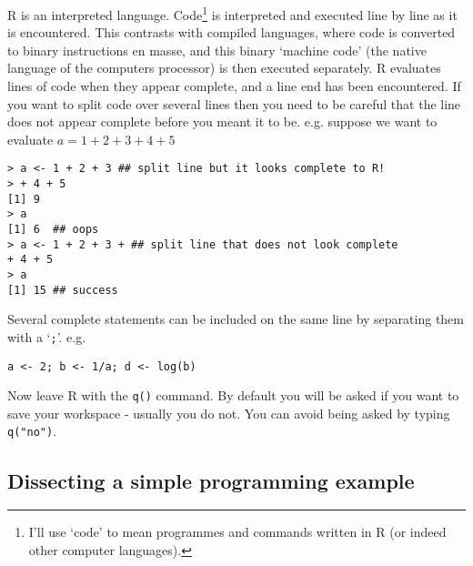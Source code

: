 \documentclass[10pt] {article}
\theoremstyle{definition}
\begin{document}
R is an interpreted language. Code\footnote{I'll use `code' to mean programmes and commands written in R (or indeed other computer languages).} is interpreted and executed line by line as it is encountered. This contrasts with compiled languages, where code is converted to binary instructions en masse, and this binary `machine code' (the native language of the computers processor) is then executed separately. R evaluates lines of code when they appear complete, and a line end has been encountered. If you want to split code over several lines then you need to be careful that the line does not appear complete before you meant it to be. e.g. suppose we want to evaluate $a=1+2+3+4+5$
\begin{lstlisting}
> a <- 1 + 2 + 3 ## split line but it looks complete to R!
> + 4 + 5 
[1] 9
> a 
[1] 6  ## oops
> a <- 1 + 2 + 3 + ## split line that does not look complete
+ 4 + 5
> a
[1] 15 ## success
\end{lstlisting}
Several complete statements can be included on the same line by separating them with a `{\tt ;}'. e.g.
\begin{lstlisting}
a <- 2; b <- 1/a; d <- log(b)
\end{lstlisting}
Now leave R with the \lstinline+q()+ command. By default you will be asked if you want to save your workspace - usually you do not. You can avoid being asked by typing \lstinline+q("no")+. 

\subsection{Dissecting a simple programming example}
\end{document}
